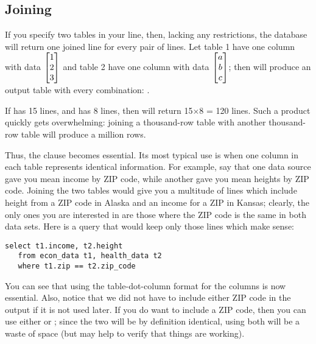 \subsection{Joining}
If you specify two tables in your  line, then, lacking any
restrictions, the database will return one joined line for every pair of lines.
Let table 1 have one column with data $\left[\begin{matrix}1\cr 2\cr 3\end{matrix}\right]$ and table 2 have one column
with data $\left[\begin{matrix}a\cr b\cr c\end{matrix}\right]$; then  will
produce an output table with every combination:
. 

If  has 15 lines, and  has 8 lines, then
 will return 15$\times$8 = 120 lines.
Such a product quickly gets overwhelming: joining a thousand-row table
with another thousand-row table will produce a million rows.

Thus, the  clause becomes essential. Its most typical use is
when one column in each table represents identical information. For
example, say that one data source gave you mean income by ZIP code,
while another gave you mean heights by ZIP code. Joining the two tables
would give you a multitude of lines which include height from a ZIP code
in Alaska and an income for a ZIP in Kansas; clearly, the only ones you
are interested in are those where the ZIP code is the same in both data
sets. Here is a query that would keep only those lines which make
sense:

\begin{lstlisting}
select t1.income, t2.height
   from econ_data t1, health_data t2
   where t1.zip == t2.zip_code
\end{lstlisting}

You can see that using the table-dot-column format for the columns is now
essential. Also, notice that we did not have to include either ZIP code
in the output if it is not used later. If you do want to include a ZIP
code, then you can use either  or ; since
the two will be by definition identical, using both will be a waste of
space (but may help to verify that things are working).


